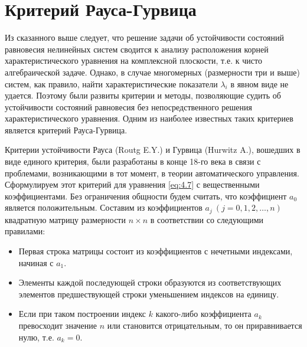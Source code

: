 \section{Критерий Рауса-Гурвица}%
\label{sec:4.2}

Из сказанного выше следует, что решение задачи об устойчивости
состояний равновесия нелинейных систем сводится к анализу расположения
корней характеристического уравнения на комплексной плоскости, т.е. к чисто
алгебраической задаче. Однако, в случае многомерных (размерности три и
выше) систем, как правило, найти характеристические показатели
$\lambda_i$ в явном
виде не удается. Поэтому были развиты критерии и методы, позволяющие
судить об устойчивости состояний равновесия без непосредственного решения
характеристического уравнения. Одним из наиболее известных таких критериев
является критерий Рауса-Гурвица.

Критерии устойчивости Рауса (Routg E.Y.) и Гурвица (Hurwitz A.), вошедших в виде единого критерия, были разработаны в конце 18-го века в связи с проблемами, возникающими в тот момент, в теории автоматического управления. Сформулируем этот критерий для уравнения \eqref{eq:4.7} с вещественными коэффициентами. Без ограничения общности будем считать, что коэффициент $a_0$ является положительным. Составим из коэффициентов $a_j ~ (j=0,1,2,\dots,n)$ квадратную матрицу размерности $n\times n$ в соответствии со следующими правилами:
\begin{itemize}
        \item Первая строка матрицы состоит из коэффициентов с нечетными индексами, начиная с $a_1$.
        \item Элементы каждой последующей строки образуются из соответствующих элементов предшествующей строки уменьшением индексов на единицу.
        \item Если при таком построении индекс $k$ какого-либо коэффициента $a_k$ превосходит значение $n$ или становится отрицательным, то он приравнивается нулю, т.е. $a_k=0$. 
\end{itemize}

